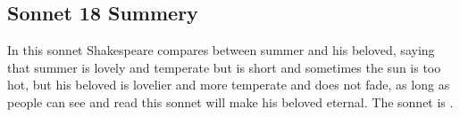 \documentclass[12pt, a4paper]{article}
\begin{document}
\subsection*{Sonnet 18 Summery}

In this sonnet Shakespeare compares between summer and his beloved, saying that summer is lovely and temperate
but is short and sometimes the sun is too hot, but his beloved is 
lovelier and more temperate and does not fade, as long as 
people can see and read this sonnet will make his beloved eternal. The 
sonnet is .
\end{document}
